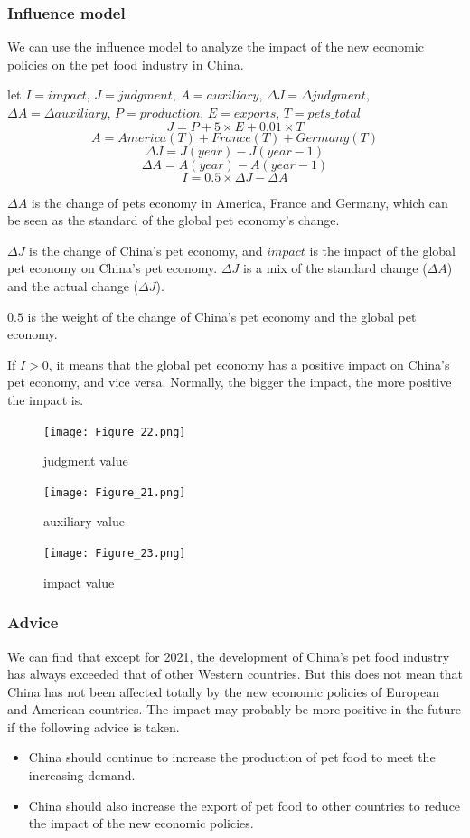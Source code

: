 \documentclass[withoutpreface,bwprint]{cumcmthesis} %
\begin{document}
\subsubsection{Influence model}
\par We can use the influence model to analyze the impact of the new economic policies on the pet food industry in China.
\begin{definition}[impact]
    let \(I=impact\), \(J=judgment\), \(A=auxiliary\), \(\Delta J=\Delta judgment\), \(\Delta A=\Delta auxiliary\),
    \(P=production\), \(E=exports\), \(T=pets\_total\)
    \[J = P + 5 \times E + 0.01\times T\]
    \[A = America(T) + France(T) + Germany(T)\]
    \[\Delta J = J(year) - J(year-1)\]
    \[\Delta A = A(year) - A(year-1)\]
    \[I = 0.5 \times \Delta J - \Delta A\]
\end{definition}
\par \(\Delta A\) is the change of pets economy in America, France and Germany, which can be seen as the standard of the global pet economy's change.
\par \(\Delta J\) is the change of China's pet economy, and \(impact\) is the impact of the global pet economy on China's pet economy.
\(\Delta J\) is a mix of the standard change (\(\Delta A\)) and the actual change (\(\Delta J\)).
\par \(0.5\) is the weight of the change of China's pet economy and the global pet economy.
\par If \(I > 0\), it means that the global pet economy has a positive impact on China's pet economy, and vice versa.
Normally, the bigger the impact, the more positive the impact is.
\begin{figure}[htbp]
	\centering
	\texttt{[image: Figure\_22.png]}
	\caption{judgment value}
\end{figure}
\begin{figure}[htbp]
	\centering
	\texttt{[image: Figure\_21.png]}
	\caption{auxiliary value}
\end{figure}
\clearpage
\begin{figure}[htbp]
	\centering
	\texttt{[image: Figure\_23.png]}
	\caption{impact value}
\end{figure}

\subsubsection{Advice}
\par We can find that except for 2021, the development of China's pet food industry has always exceeded that of other Western countries.
But this does not mean that China has not been affected totally by the new economic policies of European and American countries.
The impact may probably be more positive in the future if the following advice is taken.
\begin{itemize}
    \item China should continue to increase the production of pet food to meet the increasing demand.
    \item China should also increase the export of pet food to other countries to reduce the impact of the new economic policies.
\end{itemize}
\end{document}
